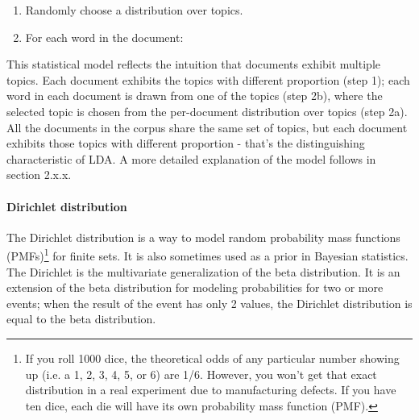 \documentclass[12pt]{report}
\begin{document}
\vspace{3mm}

\begin{enumerate}
\item Randomly choose a distribution over topics.
\item For each word in the document:
\end{enumerate}

\vspace{3mm}

This statistical model reflects the intuition that documents exhibit multiple topics. Each document exhibits the topics with different proportion (step 1); each word in each document is drawn from one of the topics (step 2b), where the selected topic is chosen from the per-document distribution over topics (step 2a). All the documents in the corpus share the same set of topics, but each document exhibits those topics with different proportion - that’s the distinguishing characteristic of LDA.
A more detailed explanation of the model follows in section 2.x.x.\par

\vspace{10mm}

\paragraph{Dirichlet distribution}

\vspace{5mm}

The Dirichlet distribution is a way to model random probability mass functions (PMFs)\footnote{If you roll 1000 dice, the theoretical odds of any particular number showing up (i.e. a 1, 2, 3, 4, 5, or 6) are 1/6. However, you won’t get that exact distribution in a real experiment due to manufacturing defects. If you have ten dice, each die will have its own probability mass function (PMF).} for finite sets. It is also sometimes used as a prior in Bayesian statistics. The Dirichlet is the multivariate generalization of the beta distribution. It is an extension of the beta distribution for modeling probabilities for two or more events; when the result of the event has only 2 values, the Dirichlet distribution is equal to the beta distribution.\par
\end{document}
